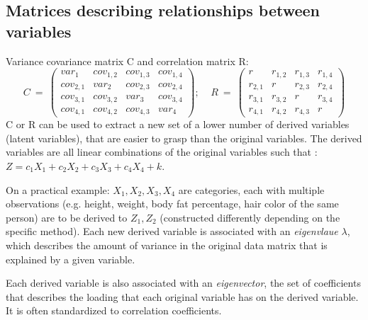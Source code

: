 \documentclass{article}
\begin{document}
\subsection{Matrices describing relationships between variables}
Variance covariance matrix C and correlation matrix R:
\begin{equation*} 
C \: = \:
    \begin{pmatrix}
    var_1 & cov_{1,2} & cov_{1,3} & cov_{1,4} \\
    cov_{2,1} & var_2 & cov_{2,3} & cov_{2,4} \\
    cov_{3,1} & cov_{3,2} & var_3 & cov_{3,4} \\
    cov_{4,1} & cov_{4,2} & cov_{4,3} & var_4
    \end{pmatrix}
; \; \; \; \; R \:=\:
    \begin{pmatrix}
    r & r_{1,2} & r_{1,3} & r_{1,4} \\
    r_{2,1} & r & r_{2,3} & r_{2,4} \\
    r_{3,1} & r_{3,2} & r & r_{3,4} \\
    r_{4,1} & r_{4,2} & r_{4,3} & r
    \end{pmatrix}
\end{equation*}
C or R can be used to extract a new set of a lower number of derived variables (latent variables), that are easier to grasp than the original variables. The derived variables are all linear combinations of the original variables such that : $Z = c_1X_1 + c_2X_2 + c_3X_3 + c_4X_4 + k$.\par 
On a practical example: $X_1, X_2, X_3, X_4$ are categories, each with multiple observations (e.g. height, weight, body fat percentage, hair color of the same person) are to be derived to $Z_1, Z_2$ (constructed differently depending on the specific method). Each new derived variable is associated with an \textit{eigenvlaue} $\lambda$, which describes the amount of variance in  the original data matrix that is explained by a given variable. \par 
Each derived variable is also associated with an \textit{eigenvector}, the set of coefficients that describes the loading that each original variable has on the derived variable. It is often standardized to correlation coefficients.
\end{document}
